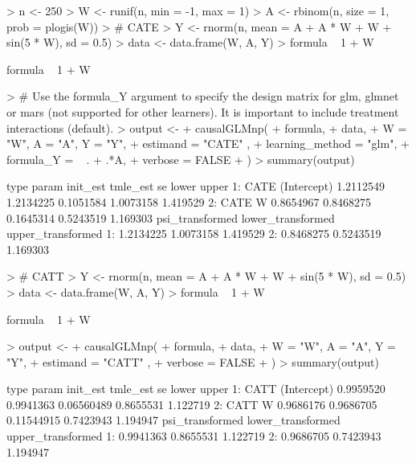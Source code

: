 \documentclass{article}
\begin{document}
\begin{Schunk}
\begin{Sinput}
> n <- 250
> W <- runif(n, min = -1,  max = 1)
> A <- rbinom(n, size = 1, prob = plogis(W))
> # CATE
> Y <- rnorm(n, mean = A + A * W + W + sin(5 * W), sd = 0.5)
> data <- data.frame(W, A, Y)
> formula ~ 1 + W
\end{Sinput}
\begin{Soutput}
formula ~ 1 + W
\end{Soutput}
\begin{Sinput}
> # Use the formula_Y argument to specify the design matrix for glm, glmnet or mars (not supported for other learners). It is important to include treatment interactions (default).
> output <-
+   causalGLMnp(
+     formula,
+     data,
+     W = "W", A = "A", Y = "Y",
+     estimand = "CATE" ,
+     learning_method = "glm",
+     formula_Y = ~ . + .*A,
+     verbose = FALSE
+   )
> summary(output)
\end{Sinput}
\begin{Soutput}
   type       param  init_est  tmle_est        se     lower    upper
1: CATE (Intercept) 1.2112549 1.2134225 0.1051584 1.0073158 1.419529
2: CATE           W 0.8654967 0.8468275 0.1645314 0.5243519 1.169303
   psi_transformed lower_transformed upper_transformed
1:       1.2134225         1.0073158          1.419529
2:       0.8468275         0.5243519          1.169303
\end{Soutput}
\begin{Sinput}
> # CATT
> Y <- rnorm(n, mean = A + A * W + W + sin(5 * W), sd = 0.5)
> data <- data.frame(W, A, Y)
> formula ~ 1 + W
\end{Sinput}
\begin{Soutput}
formula ~ 1 + W
\end{Soutput}
\begin{Sinput}
> output <-
+   causalGLMnp(
+     formula,
+     data,
+     W = "W", A = "A", Y = "Y",
+     estimand = "CATT" ,
+     verbose = FALSE
+   )
> summary(output)
\end{Sinput}
\begin{Soutput}
   type       param  init_est  tmle_est         se     lower    upper
1: CATT (Intercept) 0.9959520 0.9941363 0.06560489 0.8655531 1.122719
2: CATT           W 0.9686176 0.9686705 0.11544915 0.7423943 1.194947
   psi_transformed lower_transformed upper_transformed
1:       0.9941363         0.8655531          1.122719
2:       0.9686705         0.7423943          1.194947
\end{Soutput}
\begin{Sinput}

\end{Sinput}
\end{Schunk}
\end{document}
